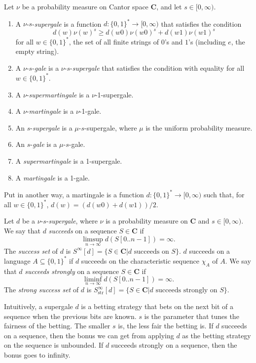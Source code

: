 \documentclass[12pt]{article}
\begin{document}
Let $\nu$ be a probability measure on Cantor space $\mathbf{C}$, and let $s\in[0, \infty)$.
\begin{enumerate}
\item
A $\nu$-$s$-{\it supergale} is a function $d:\lbrace 0,1\rbrace ^{*}\rightarrow [0,\infty)$ that satisfies the condition 
\begin{equation}
d(w)\nu(w)^{s}\geq d(w0)\nu(w0)^{s}+d(w1)\nu(w1)^{s}
\end{equation}
for all $w\in\lbrace 0,1\rbrace^{*}$, the set of all finite strings of $0$'s and $1$'s (including $e$, the empty string).
\item
A $\nu$-$s$-{\it gale} is a $\nu$-$s$-{\it supergale} that satisfies the condition with equality for all $w\in\lbrace 0,1\rbrace^{*}$.
\item
A $\nu$-{\it supermartingale} is a $\nu$-1-supergale.
\item
A $\nu$-{\it martingale} is a $\nu$-1-gale.
\item
An $s$-{\it supergale} is a $\mu$-$s$-supergale, where $\mu$ is the uniform probability measure.
\item
An $s$-{\it gale} is a $\mu$-$s$-gale.
\item
A {\it supermartingale} is a 1-supergale.
\item
A {\it martingale} is a 1-gale.
\end{enumerate}

Put in another way, a martingale is a function $d:\lbrace 0,1 \rbrace^{*}\rightarrow [0,\infty)$ such that, for all $w\in \lbrace 0,1 \rbrace^{*}$, $d(w)=(d(w0)+d(w1))/2$.

Let $d$ be a $\nu$-$s$-{\it supergale}, where $\nu$ is a probability measure on $\mathbf{C}$ and $s\in[0,\infty)$. We say that $d$ {\it succeeds} on a sequence $S\in\mathbf{C}$ if\[\limsup_{n\rightarrow \infty} d(S[0..n-1])=\infty.\]
The {\it success set} of $d$ is $S^{\infty}[d]=\lbrace S\in\mathbf{C}\bigl | d\text{ succeeds on }S\rbrace$.
$d$ succeeds on a language $A\subseteq \lbrace 0,1 \rbrace^{*}$ if $d$ succeeds on the characteristic sequence $\chi_A$ of $A$. We say that $d$ {\it succeeds strongly} on a sequence $S\in\mathbf{C}$ if\[\liminf_{n\rightarrow\infty}d(S[0..n-1])=\infty.\]
The {\it strong success set} of $d$ is $S^{\infty}_{\text{str}}[d]=\lbrace S\in\mathbf{C}\bigl | d\text{ succeeds strongly on }S\rbrace$.


Intuitively, a supergale $d$ is a betting strategy that bets on the next bit of a sequence when the previous bits are known. $s$ is the parameter that tunes the fairness of the betting. The smaller $s$ is, the less fair the betting is. If $d$ succeeds on a sequence, then the bonus we can get from applying $d$ as the betting strategy on the sequence is unbounded. If $d$ succeeds strongly on a sequence, then the bonus goes to infinity.
\end{document}
